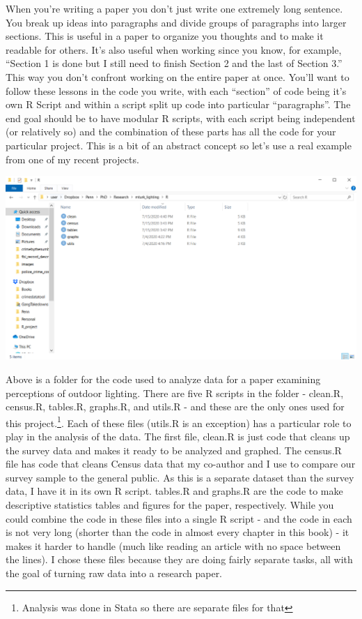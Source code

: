 \documentclass[
  12pt,
]{book}
\begin{document}
When you're writing a paper you don't just write one extremely long sentence. You break up ideas into paragraphs and divide groups of paragraphs into larger sections. This is useful in a paper to organize you thoughts and to make it readable for others. It's also useful when working since you know, for example, ``Section 1 is done but I still need to finish Section 2 and the last of Section 3.'' This way you don't confront working on the entire paper at once. You'll want to follow these lessons in the code you write, with each ``section'' of code being it's own R Script and within a script split up code into particular ``paragraphs''. The end goal should be to have modular R scripts, with each script being independent (or relatively so) and the combination of these parts has all the code for your particular project. This is a bit of an abstract concept so let's use a real example from one of my recent projects.

\includegraphics{images/modular_scripts.PNG}

Above is a folder for the code used to analyze data for a paper examining perceptions of outdoor lighting. There are five R scripts in the folder - clean.R, census.R, tables.R, graphs.R, and utils.R - and these are the only ones used for this project.\footnote{Analysis was done in Stata so there are separate files for that}. Each of these files (utils.R is an exception) has a particular role to play in the analysis of the data. The first file, clean.R is just code that cleans up the survey data and makes it ready to be analyzed and graphed. The census.R file has code that cleans Census data that my co-author and I use to compare our survey sample to the general public. As this is a separate dataset than the survey data, I have it in its own R script. tables.R and graphs.R are the code to make descriptive statistics tables and figures for the paper, respectively. While you could combine the code in these files into a single R script - and the code in each is not very long (shorter than the code in almost every chapter in this book) - it makes it harder to handle (much like reading an article with no space between the lines). I chose these files because they are doing fairly separate tasks, all with the goal of turning raw data into a research paper.
\end{document}
